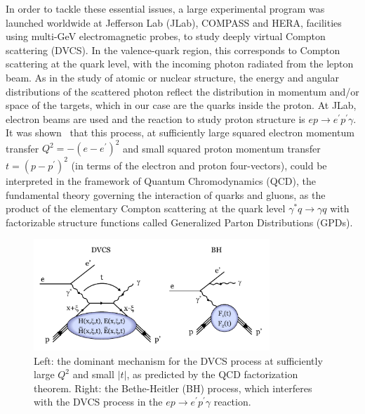 \documentclass[nofootinbib,twocolumn,showpacs,prl,superscriptaddress,secnumarabic,amssymb,nobibnotes,aps,floatfix]{revtex4-1}
\begin{document}
In order to tackle these essential issues, a large experimental program was launched
worldwide at Jefferson Lab (JLab), COMPASS and HERA, facilities using multi-GeV
electromagnetic probes, to study deeply virtual Compton
scattering (DVCS). In the valence-quark region, this corresponds to Compton scattering
at the quark level, with the incoming photon radiated from the lepton beam. As in the study of
atomic or nuclear structure, the energy and angular distributions of the scattered photon reflect
the distribution in momentum and/or space of the targets, which in our case are the quarks
inside the proton. At JLab, electron beams are used and the reaction to study proton
structure is $ep\to e^\prime p^\prime \gamma$.
It was shown~\cite{Mueller:1998fv,Ji:1996ek,Ji:1996nm,Radyushkin:1996nd,Radyushkin:1997ki}
that this process, at sufficiently large squared electron momentum transfer 
$Q^2=-(e-e^\prime)^2$ 
and small squared proton momentum transfer $t=(p-p^\prime)^2$ (in terms of the electron
and proton four-vectors), could be interpreted in the framework
of Quantum Chromodynamics (QCD), the fundamental theory governing the interaction of quarks and 
gluons, as the product of the elementary Compton scattering at the quark level $\gamma^* q\to 
\gamma q$ with factorizable structure functions called Generalized Parton Distributions (GPDs).
\begin{figure}[tb]
\includegraphics[width=8.9cm]{fig1.pdf}
\vspace{-0.9cm}
\caption{Left: the dominant mechanism for the DVCS process at sufficiently large $Q^2$ and 
small $|t|$, as predicted by the QCD factorization theorem.
Right: the Bethe-Heitler (BH) process, which interferes with the DVCS process in the
$ep\to e^\prime p^\prime \gamma$ reaction.}
\label{fig:diags}
\end{figure}
\end{document}
